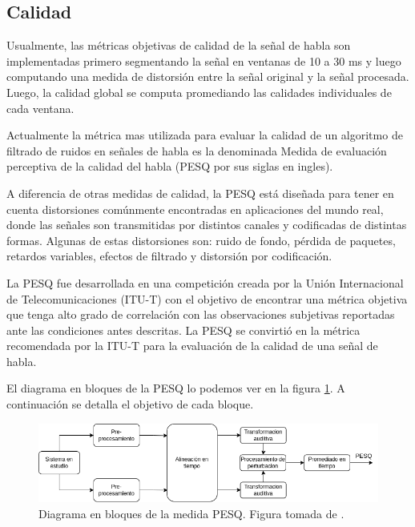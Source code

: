 \subsection{Calidad}

Usualmente, las métricas objetivas de calidad de la señal de habla son implementadas primero segmentando la señal en ventanas de 10 a 30 ms y luego computando una medida de distorsión entre la señal original y la señal procesada. Luego, la calidad global se computa promediando las calidades individuales de cada ventana.

Actualmente la métrica mas utilizada para evaluar la calidad de un algoritmo de filtrado de ruidos en señales de habla es la denominada Medida de evaluación perceptiva de la calidad del habla \cite{perceptual_evaluation_of_speech_quality_a_new_method_for_speech_quality_assessment_of_telephone_networks_and_codecs,speech_enhancement_theory_and_practice} (PESQ por sus siglas en ingles).

A diferencia de otras medidas de calidad, la PESQ está diseñada para tener en cuenta distorsiones comúnmente encontradas en aplicaciones del mundo real, donde las señales son transmitidas por distintos canales y codificadas de distintas formas.  Algunas de estas distorsiones son: ruido de fondo, pérdida de paquetes, retardos variables, efectos de filtrado y distorsión por codificación.

La PESQ fue desarrollada en una competición creada por la Unión Internacional de Telecomunicaciones (ITU-T) con el objetivo de encontrar una métrica objetiva que tenga alto grado de correlación con las observaciones subjetivas reportadas ante las condiciones antes descritas. La PESQ se convirtió en la métrica recomendada por la ITU-T para la evaluación de la calidad de una señal de habla.

El diagrama en bloques de la PESQ lo podemos ver en la figura \ref{fig:ch4_pesq_schematic}. A continuación se detalla el objetivo de cada bloque.

\begin{figure}
	\centering
	\centerline{\includegraphics[scale=0.6]{images/ch4/pesq_schematic.png}}
	\caption{Diagrama en bloques de la medida PESQ. Figura tomada de \cite{speech_enhancement_theory_and_practice}.}
	\label{fig:ch4_pesq_schematic}
\end{figure}

